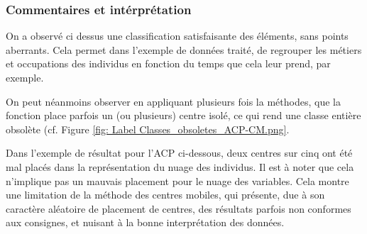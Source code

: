 \subsubsection{Commentaires et intérprétation}


On a observé ci dessus une classification satisfaisante des éléments, sans points aberrants. Cela permet dans l'exemple de données traité, de regrouper les métiers et occupations des individus en fonction du temps que cela leur prend, par exemple.

On peut néanmoins observer en appliquant plusieurs fois la méthodes, que la fonction place parfois un (ou plusieurs) centre isolé, ce qui rend une classe entière obsolète (cf. Figure \ref{fig: Label Classes_obsoletes_ACP-CM.png}.


Dans l'exemple de résultat pour l'ACP ci-dessous, deux centres sur cinq ont été mal placés dans la représentation du nuage des individus. Il est à noter que cela n'implique pas un mauvais placement pour le nuage des variables. Cela montre une limitation de la méthode des centres mobiles, qui présente, due à son caractère aléatoire de placement de centres, des résultats parfois non conformes aux consignes, et nuisant à la bonne interprétation des données.

